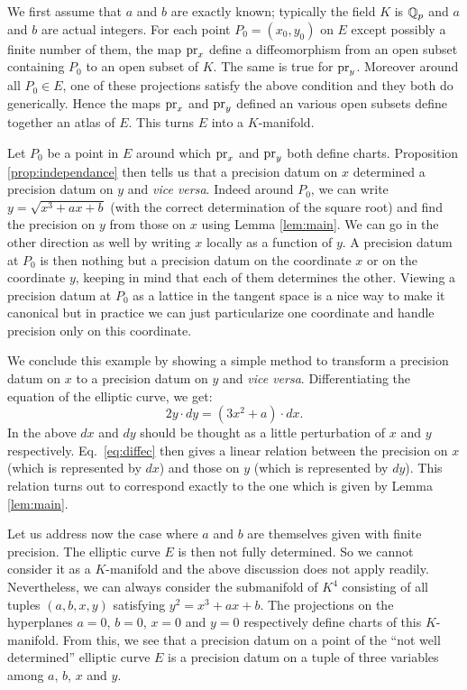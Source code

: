 \documentclass{lms}
\begin{document}
We first assume that $a$ and $b$ are exactly known; typically the field 
$K$ is $\mathbb Q_p$ and $a$ and $b$ are actual integers. For each point $P_0 = 
(x_0, y_0)$ on $E$ except possibly a finite number of them, the map 
$\text{\rm pr}_x$ define a diffeomorphism from an open subset containing $P_0$ to 
an open subset of $K$. The same is true for $\text{\rm pr}_y$. Moreover around all 
$P_0 \in E$, one of these projections satisfy the above condition and
they both do generically. Hence the maps $\text{\rm pr}_x$ and $\text{\rm pr}_y$ defined an 
various open subsets define together an atlas of $E$. This turns $E$ into 
a $K$-manifold.

Let $P_0$ be a point in $E$ around which $\text{\rm pr}_x$ and $\text{\rm pr}_y$ both define 
charts. Proposition \ref{prop:independance} then tells us that a 
precision datum on $x$ determined a precision datum on $y$ and \emph{vice 
versa}. Indeed around $P_0$, we can write $y = \sqrt{x^3 + a x + b}$ 
(with the correct determination of the square root) and find the 
precision on $y$ from those on $x$ using Lemma \ref{lem:main}. We can go 
in the other direction as well by writing $x$ locally as a function of 
$y$. A precision datum at $P_0$ is then nothing but a precision datum
on the coordinate $x$ or on the coordinate $y$, keeping in mind that 
each of them determines the other. Viewing a precision datum at $P_0$ as 
a lattice in the tangent space is a nice way to make it canonical but in 
practice we can just particularize one coordinate and handle precision
only on this coordinate.

We conclude this example by showing a simple method to transform a
precision datum on $x$ to a precision datum on $y$ and \emph{vice versa}.
Differentiating the equation of the elliptic curve, we get:
\begin{equation}
\label{eq:diffec}
2 y \cdot dy = (3 x^2 + a) \cdot dx.
\end{equation}
In the above $dx$ and $dy$ should be thought as a little perturbation of 
$x$ and $y$ respectively. Eq.~\eqref{eq:diffec} then gives a linear 
relation between the precision on $x$ (which is represented by $dx$) and 
those on $y$ (which is represented by $dy$). This relation turns out to
correspond exactly to the one which is given by Lemma \ref{lem:main}.

\medskip

Let us address now the case where $a$ and $b$ are themselves given with 
finite precision. The elliptic curve $E$ is then not fully determined. So 
we cannot consider it as a $K$-manifold and the above discussion does not 
apply readily. Nevertheless, we can always consider the submanifold of 
$K^4$ consisting of all tuples $(a,b,x,y)$ satisfying $y^2 = x^3 + a x + 
b$. The projections on the hyperplanes $a = 0$, $b = 0$, $x = 0$ and $y = 
0$ respectively define charts of this $K$-manifold. From this, we see 
that a precision datum on a point of the ``not well determined'' elliptic 
curve $E$ is a precision datum on a tuple of three variables among $a$, 
$b$, $x$ and $y$.
\end{document}
